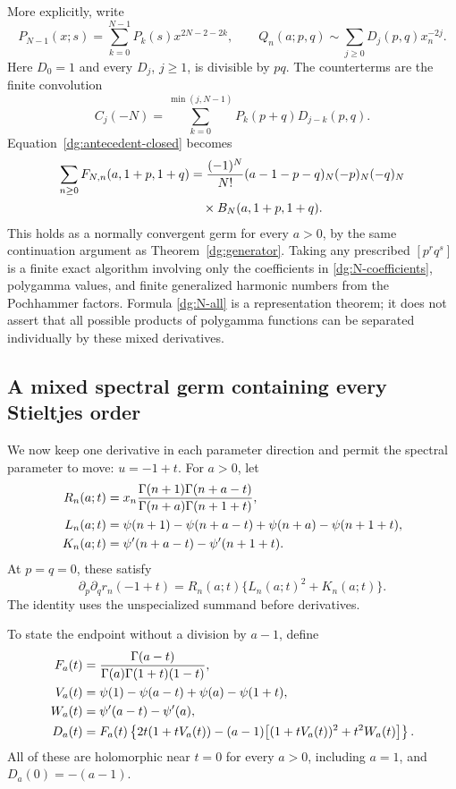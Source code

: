 More explicitly, write
\[
 P_{N-1}(x;s)=\sum_{k=0}^{N-1}P_k(s)x^{2N-2-2k},\qquad
 Q_n(a;p,q)\sim\sum_{j\geq0}D_j(p,q)x_n^{-2j}.
\]
Here $D_0=1$ and every $D_j$, $j\geq1$, is divisible by $pq$.
The counterterms are the finite convolution
\begin{equation}
 C_j(-N)=\sum_{k=0}^{\min(j,N-1)}P_k(p+q)D_{j-k}(p,q).
 \label{dg:N-coefficients}
\end{equation}
Equation~\eqref{dg:antecedent-closed} becomes
\begin{align}
 \sum_{n\geq0}F_{N,n}(a,1+p,1+q)
 &=\frac{(-1)^N}{N!}(a-1-p-q)_N(-p)_N(-q)_N\notag\\
 &\quad\times B_N(a,1+p,1+q).
 \label{dg:N-all}
\end{align}
This holds as a normally convergent germ for every $a>0$, by the
same continuation argument as Theorem~\ref{dg:generator}.
Taking any prescribed $[p^rq^s]$ is a finite exact algorithm involving
only the coefficients in \eqref{dg:N-coefficients}, polygamma
values, and finite generalized harmonic numbers from the Pochhammer
factors. Formula \eqref{dg:N-all} is a representation theorem;
it does not assert that all possible products of polygamma functions
can be separated individually by these mixed derivatives.

\subsection{A mixed spectral germ containing every Stieltjes order}

We now keep one derivative in each parameter direction and permit
the spectral parameter to move: $u=-1+t$. For $a>0$, let
\begin{align}
 R_n(a;t)&=x_n\frac{\Gamma(n+1)\Gamma(n+a-t)}
                       {\Gamma(n+a)\Gamma(n+1+t)},\notag\\
 L_n(a;t)&=\psi(n+1)-\psi(n+a-t)+\psi(n+a)-\psi(n+1+t),\notag\\
 K_n(a;t)&=\psi'(n+a-t)-\psi'(n+1+t).
 \label{dg:spectral-summands}
\end{align}
At $p=q=0$, these satisfy
\[
 \partial_p\partial_q r_n(-1+t)
                 =R_n(a;t)\{L_n(a;t)^2+K_n(a;t)\}.
\]
The identity uses the unspecialized summand before derivatives.

To state the endpoint without a division by $a-1$, define
\begin{align}
 F_a(t)&=\frac{\Gamma(a-t)}{\Gamma(a)\Gamma(1+t)(1-t)},\notag\\
 V_a(t)&=\psi(1)-\psi(a-t)+\psi(a)-\psi(1+t),\notag\\
 W_a(t)&=\psi'(a-t)-\psi'(a),\notag\\
 D_a(t)&=F_a(t)\left\{2t(1+tV_a(t))
 -(a-1)\bigl[(1+tV_a(t))^2+t^2W_a(t)\bigr]\right\}.
 \label{dg:D}
\end{align}
All of these are holomorphic near $t=0$ for every $a>0$, including
$a=1$, and $D_a(0)=-(a-1)$.

